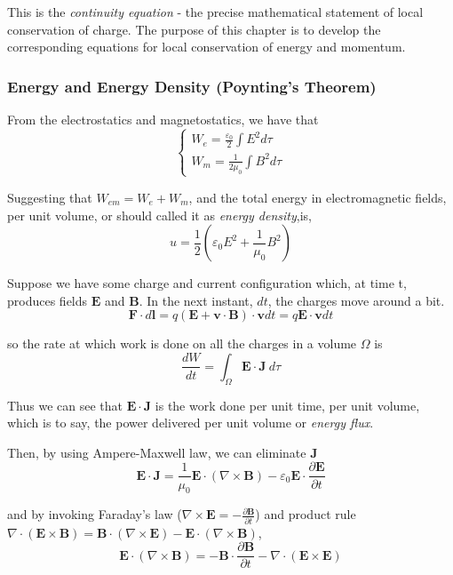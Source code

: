 \documentclass[openany]{book}
\begin{document}
This is the \emph{continuity equation} - the precise mathematical statement of local conservation of charge. The purpose of this chapter is to develop the corresponding equations for local conservation of energy and momentum.
\subsubsection{Energy and Energy Density (Poynting's Theorem)}
From the electrostatics and magnetostatics, we have that
\[\begin{cases}
W_e=\frac{\varepsilon _0}{2}\displaystyle\int E^2d\tau\\
W_m=\frac{1}{2\mu _0}\displaystyle\int B^2d\tau
\end{cases}\]

Suggesting that $W_{em}=W_e+W_m$, and the total energy in electromagnetic fields, per unit volume, or should called it as \emph{energy density},is,
\[u=\frac{1}{2}\left(\varepsilon _0E^2+\frac{1}{\mu_0}B^2\right)\]

Suppose we have some charge and current configuration which, at time t, produces fields $\mathbf{E}$ and $\mathbf{B}$. In the next instant, $dt$, the charges move around a bit.
\[\mathbf{F}\cdot d\mathbf{l}=q(\mathbf{E}+\mathbf{v}\cdot \mathbf{B})\cdot \mathbf{v}dt=q\mathbf{E}\cdot \mathbf{v}dt\]

so the rate at which work is done on all the charges in a volume $\Omega $ is
\[\frac{dW}{dt}=\int _{\Omega }\mathbf{E}\cdot \mathbf{J}\ d\tau \]

Thus we can see that $\mathbf{E}\cdot \mathbf{J}$ is the work done per unit time, per unit volume, which is to say, the power delivered per unit volume or \emph{energy flux}. 

Then, by using Ampere-Maxwell law, we can eliminate $\mathbf{J}$
\[\mathbf{E}\cdot \mathbf{J}=\frac{1}{\mu_0}\mathbf{E}\cdot (\nabla \times \mathbf{B})-\varepsilon_0\mathbf{E}\cdot \frac{\partial \mathbf{E}}{\partial t}\]

and by invoking Faraday's law ($\nabla \times \mathbf{E}=-\frac{\partial \mathbf{B}}{\partial t}$) and product rule $\nabla \cdot \left(\mathbf{E}\times \mathbf{B}\right)=\mathbf{B}\cdot \left(\nabla \times \mathbf{E}\right)-\mathbf{E}\cdot \left(\nabla \times \mathbf{B}\right)$,
\[\mathbf{E}\cdot (\nabla \times \mathbf{B})=-\mathbf{B}\cdot \frac{\partial \mathbf{B}}{\partial t}-\nabla \cdot (\mathbf{E}\times \mathbf{E})\]
\end{document}
